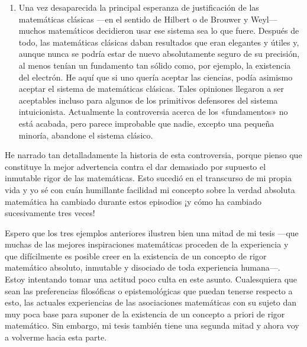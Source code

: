 \documentclass[a4paper, 12pt]{article}
\begin{document}
{\begin{enumerate}
\item  Una vez desaparecida la principal esperanza de justificación de las matemáticas clásicas ---en el sentido de Hilbert o de Brouwer y Weyl--- muchos matemáticos decidieron usar ese sistema sea lo que fuere. Después de todo, las matemáticas clásicas daban resultados que eran elegantes y útiles y, aunque nunca se podría estar de nuevo absolutamente seguro de su precisión, al menos tenían un fundamento tan sólido como, por ejemplo, la existencia del electrón. He aquí que si uno quería aceptar las ciencias, podía asimismo aceptar el sistema de matemáticas clásicas. Tales opiniones llegaron a ser aceptables incluso para algunos de los primitivos defensores del sistema intuicionista. Actualmente la controversia acerca de los «fundamentos» no está acabada, pero parece improbable que nadie, excepto una pequeña minoría, abandone el sistema clásico.

\end{enumerate}



He narrado tan detalladamente la historia de esta controversia, porque pienso que constituye la mejor advertencia contra el dar demasiado por supuesto el inmutable rigor de las matemáticas. Esto sucedió en el transcurso de mi propia vida y yo sé con cuán humillante facilidad mi concepto sobre la verdad absoluta matemática  ha cambiado durante estos episodios ¡y cómo ha cambiado sucesivamente tres veces!

Espero que los tres ejemplos anteriores ilustren bien una mitad de mi tesis ---que muchas de las mejores inspiraciones matemáticas proceden de la experiencia y que difícilmente es posible creer en la existencia de un concepto de rigor matemático absoluto, inmutable y disociado de toda experiencia humana---. Estoy intentando tomar una actitud poco culta en este asunto. Cualesquiera que sean las preferencias filosóficas o epistemológicas que puedan tenerse respecto a esto, las actuales experiencias de las asociaciones matemáticas con su sujeto dan muy poca base para suponer de la existencia de un concepto a priori de rigor matemático. Sin embargo, mi tesis también tiene una segunda mitad y ahora voy a volverme hacia esta parte.

}
\end{document}
